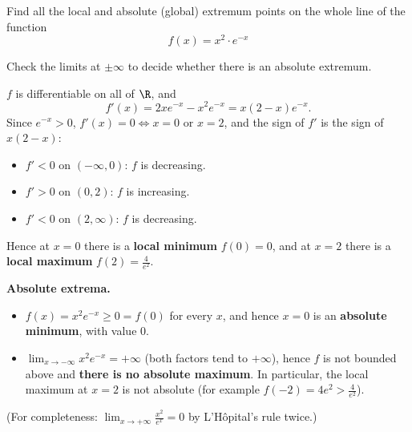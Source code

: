 
\begin{question}
Find all the local and absolute (global) extremum points on the whole line of the function
\[ f(x)=x^2\cdot e^{-x} \]
\end{question}

\begin{hint}
Check the limits at $\pm\infty$ to decide whether there is an absolute extremum.
\end{hint}

\begin{solution}
$f$ is differentiable on all of $\R$, and
\[ f'(x)=2xe^{-x}-x^2e^{-x}=x(2-x)e^{-x}. \]
Since $e^{-x}>0$, $f'(x)=0\iff x=0$ or $x=2$, and the sign of $f'$ is the sign of $x(2-x)$:
\begin{itemize}
  \item $f'<0$ on $(-\infty,0)$: $f$ is decreasing.
  \item $f'>0$ on $(0,2)$: $f$ is increasing.
  \item $f'<0$ on $(2,\infty)$: $f$ is decreasing.
\end{itemize}
Hence at $x=0$ there is a \textbf{local minimum} $f(0)=0$, and at $x=2$ there is a \textbf{local maximum} $f(2)=\frac{4}{e^2}$.

\textbf{Absolute extrema.}
\begin{itemize}
  \item $f(x)=x^2e^{-x}\ge0=f(0)$ for every $x$, and hence $x=0$ is an \textbf{absolute minimum}, with value $0$.
  \item $\lim_{x\to-\infty}x^2e^{-x}=+\infty$ (both factors tend to $+\infty$), hence $f$ is not bounded above and \textbf{there is no absolute maximum}. In particular, the local maximum at $x=2$ is not absolute (for example $f(-2)=4e^2>\frac4{e^2}$).
\end{itemize}
(For completeness: $\lim_{x\to+\infty}\frac{x^2}{e^x}=0$ by L'Hôpital's rule twice.)
\end{solution}
